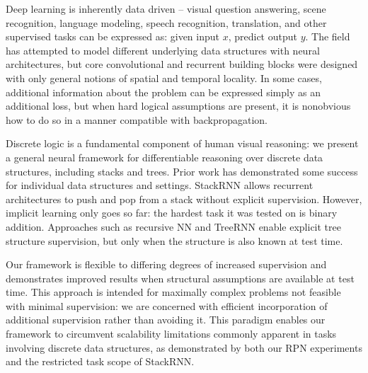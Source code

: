 \documentclass{article}
\begin{document}
Deep learning is inherently data driven -- visual question answering, scene recognition, language modeling, speech recognition, translation, and other supervised tasks can be expressed as: given input $x$, predict output $y$.
The field has attempted to model different underlying data structures with neural architectures, but core convolutional and recurrent building blocks were designed with only general notions of spatial and temporal locality. In some cases, additional information about the problem can be expressed simply as an additional loss, but when hard logical assumptions are present, it is nonobvious how to do so in a manner compatible with backpropagation.

Discrete logic is a fundamental component of human visual reasoning: we present a general neural framework for differentiable reasoning over discrete data structures, including stacks and trees. Prior work has demonstrated some success for individual data structures and settings. StackRNN \cite{DBLP:journals/corr/JoulinM15} allows recurrent architectures to push and pop from a stack without explicit supervision. However, implicit learning only goes so far: the hardest task it was tested on is binary addition. Approaches such as recursive NN \cite{SocherEtAl2011:RNN} and TreeRNN \cite{DBLP:journals/corr/TaiSM15} enable explicit tree structure supervision, but only when the structure is also known at test time.

Our framework is flexible to differing degrees of increased supervision and demonstrates improved results when structural assumptions are available at test time. This approach is intended for maximally complex problems not feasible with minimal supervision: we are concerned with efficient incorporation of additional supervision rather than avoiding it. This paradigm enables our framework to circumvent scalability limitations commonly apparent in tasks involving discrete data structures, as demonstrated by both our RPN experiments and the restricted task scope of StackRNN.
\end{document}
